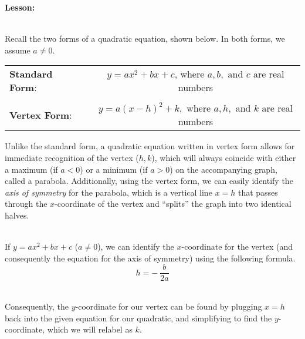 \documentclass[12pt]{article}
\theoremstyle{definition}
\begin{document}
{\bf Lesson:}\\
\ \par
Recall the two forms of a quadratic equation, shown below.  In both forms, we assume $a\neq 0$.
\begin{center}
\begin{tabular}{lcc}
{\bf Standard Form}: & & $y=ax^2+bx+c$, where $a,b,$ and $c$ are real numbers\\
&&\\
{\bf Vertex Form}: & & $y=a(x-h)^2+k,$ where $a,h,$ and $k$ are real numbers
\end{tabular}
\end{center}
Unlike the standard form, a quadratic equation written in vertex form allows for immediate recognition of the vertex ($h,k$), which will always coincide with either a maximum (if $a<0$) or a minimum (if $a>0$) on the accompanying graph, called a parabola. Additionally, using the vertex form, we can easily identify the {\it axis of symmetry} for the parabola, which is a vertical line $x=h$ that passes through the $x$-coordinate of the vertex and ``splits'' the graph into two identical halves.\\
\ \par
If $y=ax^2+bx+c$ ($a\neq0$), we can identify the $x$-coordinate for the vertex (and consequently the equation for the axis of symmetry) using the following formula.
$$h=-~\frac{b}{2a}$$ 
\ \par
Consequently, the $y$-coordinate for our vertex can be found by plugging $x=h$ back into the given equation for our quadratic, and simplifying to find the $y$-coordinate, which we will relabel as $k$.\\
\end{document}
